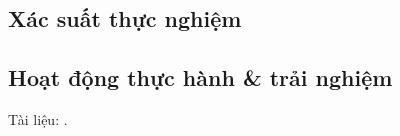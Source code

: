 \documentclass{article}
\numberwithin{equation}{section}
\begin{document}
\subsection{Xác suất thực nghiệm}

\subsection{Hoạt động thực hành \& trải nghiệm}




\newpage
Tài liệu: \cite{SGK_Toan_6_Canh_Dieu_tap_1, SGK_Toan_6_Canh_Dieu_tap_2, SBT_Toan_6_Canh_Dieu_tap_1, Binh_Toan_6_tap_1, Binh_Toan_6_tap_2, Trong_Toan_6_2021}.

\printbibliography[heading=bibintoc]
	
\end{document}
